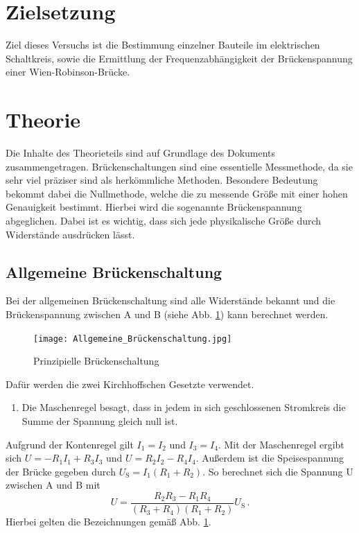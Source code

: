 \section{Zielsetzung}
Ziel dieses Versuchs ist die Bestimmung einzelner Bauteile im elektrischen Schaltkreis,
sowie die Ermittlung der Frequenzabhängigkeit der Brückenspannung einer Wien-Robinson-Brücke.

\section{Theorie}
    \label{sec:Theorie}
    Die Inhalte des Theorieteils sind auf Grundlage des Dokuments \cite{V302_Anleitung} zusammengetragen.
    Brückenschaltungen sind eine essentielle Messmethode, da sie sehr viel präziser sind als herkömmliche Methoden.
    Besondere Bedeutung bekommt dabei die Nullmethode, welche die zu messende Größe mit einer hohen Genauigkeit bestimmt.
    Hierbei wird die sogenannte Brückenspannung abgeglichen.
    Dabei ist es wichtig, dass sich jede physikalische Größe durch Widerstände ausdrücken lässt.
    \subsection{Allgemeine Brückenschaltung}
    Bei der allgemeinen Brückenschaltung sind alle Widerstände bekannt und die Brückenspannung zwischen A und B (siehe
    Abb. \ref{fig:All_Brueckenschaltung}) kann berechnet werden.
    \begin{figure}
        \centering
        \texttt{[image: Allgemeine\_Brückenschaltung.jpg]}
        \caption{Prinzipielle Brückenschaltung}
        \label{fig:All_Brueckenschaltung}
    \end{figure}
    Dafür werden die zwei Kirchhoffschen Gesetzte verwendet.
    \begin{enumerate}
        \item Die Maschenregel besagt, dass in jedem in sich geschlossenen Stromkreis die Summe der Spannung gleich null ist.
    \end{enumerate}
    Aufgrund der Kontenregel gilt $I_1 = I_2$ und $I_3 = I_4$.
    Mit der Maschenregel ergibt sich $U = -R_1 I_1 + R_3 I_3$ und $U = R_2 I_2 - R_4 I_4$.
    Außerdem ist die Speisespannung der Brücke gegeben durch $U_\text{S} = I_1(R_1 + R_2)$.
    So berechnet sich die Spannung U zwischen A und B mit
    \begin{equation}
        U = \frac{R_2 R_3 - R_1 R_4}{(R_3 + R_4)(R_1 + R_2)}U_{\text{S}} \, \text{.}
        \label{eq:Brueckenspannung}
    \end{equation}
    Hierbei gelten die Bezeichnungen gemäß Abb. \ref{fig:All_Brueckenschaltung}.
